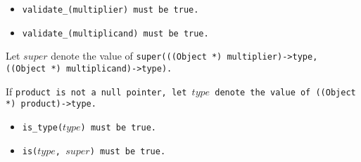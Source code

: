 \begin{itemize}

\item \tt{validate_(multiplier)} must be \tt{true}.

\item \tt{validate_(multiplicand)} must be \tt{true}.

\end{itemize}

Let $super$ denote the value of
\tt{super(((Object *) multiplier)->type, ((Object *) multiplicand)->type)}.

If \tt{product} is not a null pointer, let $type$
denote the value of \tt{((Object *) product)->type}.

\begin{itemize}

\item \tt{is_type(}$type$\tt{)} must be \tt{true}.

\item \tt{is(}$type$\tt{,} $super$\tt{)} must be \tt{true}.

\end{itemize}
